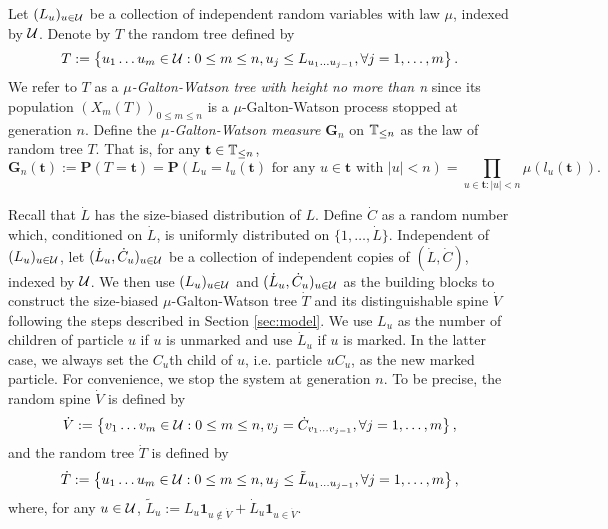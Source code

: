 \documentclass[12pt]{amsart}
\numberwithin{equation}{section}
\newcommand{\defn}[1]{{\em #1}}
\newcommand{\ind}[1]{\mathbf 1_{#1}}
\newcommand{\prob}{\mathbf P}
\newcommand{\set}[1]{\left\{ #1 \right\}}
\newcommand{\tree}{\mathbf t}
\newcommand{\bG}{\mathbf G}\newcommand{\bbG}{\mathbb G}\newcommand{\cG}{\mathcal G}
\begin{document}
\par
	Let $(L_u)_{u\in\mathcal U}$ be a collection of independent random variables with law $\mu$, indexed by $\mathcal U$. 
	Denote by $T$ the random tree defined by
\begin{equation*}
		T
	:=
		\set{u_1\dots u_m\in \cU: 0\le m\le n, u_j\leq L_{u_1\dots u_{j-1}},\forall j=1,\dots,m}.
\end{equation*}
	We refer to $T$ as a \defn{$\mu$-Galton-Watson tree with height no more than n} since its population $(X_m(T))_{0\le m\le n}$ is a $\mu$-Galton-Watson process stopped at generation $n$.
	Define the \defn{$\mu$-Galton-Watson measure $\bG_n$} on $\mathbb T_{\leq n}$ as the law of random tree $T$. That is, for any $\tree\in\bbT_{\leq n}$,
\begin{equation*}
		\bG_n(\tree)
    :=
		\prob(T=\tree)
	=
        \prob(L_u=l_u(\tree)\text{ for any } u\in\tree \text{ with }|u|<n)
	=
		\prod_{u\in \tree:|u|<n}\mu(l_u(\tree)).
\end{equation*}
\par
	Recall that $\dot L$ has the size-biased distribution of $L$.
	Define $\dot C$ as a random number which, conditioned on $\dot L$, is uniformly distributed on $\{1,\dots,\dot L\}$.
	Independent of $(L_u)_{u\in\mathcal U}$, let $(\dot L_u,\dot C_u)_{u\in \mathcal U}$ be a collection of independent copies of $(\dot L,\dot C)$, indexed by $\mathcal U$.
	We then use $(L_u)_{u\in\mathcal U}$ and $(\dot L_u,\dot C_u)_{u\in\mathcal U}$ as the building blocks to construct the size-biased $\mu$-Galton-Watson tree $\dot T$ and its distinguishable spine $\dot V$ following the steps described in Section \ref{sec:model}.
	We use $L_u$ as the number of children of particle $u$ if $u$ is unmarked and use $\dot L_u$ if $u$ is marked.
	In the latter case, we always set the $C_u$th child of $u$, i.e. particle $uC_u$, as the new marked particle.
	For convenience, we stop the system at generation $n$. To be precise, the random spine $\dot V$ is defined by
\begin{equation*}
		\dot V
	:=
		\set{v_1\dots v_m\in \cU:0\le m\le n, v_j=\dot C_{v_1\dots v_{j-1}},\forall j=1,\dots,m},
\end{equation*}
	and the random tree $\dot T$ is defined by
\begin{equation*}
		\dot T
	:=
		\set{u_1\dots u_m\in\cU: 0\le m\le n,u_j\leq \tilde L_{u_1\dots u_{j-1}},\forall j=1,\dots,m},
\end{equation*}
	where, for any $u\in\mathcal U$, $\tilde L_u:=L_u\ind{u\not\in \dot V}+\dot L_u\ind{u\in \dot V}$.
\par
\end{document}

